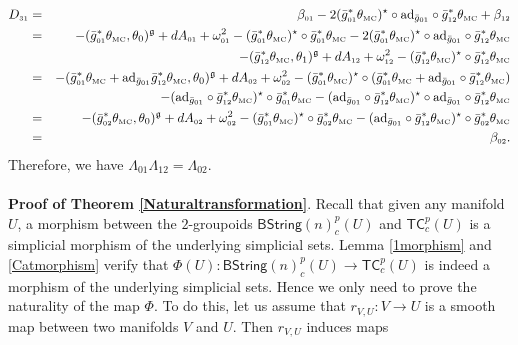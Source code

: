 \documentclass[letterpaper,10pt, oneside]{article} %
\newcommand{\tcalgdp}{{\mathsf{TC}^{p}_{c}}} %
\newcommand{\bstringnp}{\mathsf{BString}(n)^p_{c}} %
\newcommand{\TM}{\theta_{\scriptscriptstyle \mathrm{MC}}}
\def\qed{\hfill ~\vrule height6pt width6pt depth0pt}
\newcommand{\ad}{\mathrm{ad}}
\newcommand{\bg}{\bar{g}}
\begin{document}
\begin{eqnarray*}
  D_{\scriptscriptstyle 31}&=& \beta_{\scriptscriptstyle 01}-2(\bg_{\scriptscriptstyle 01}^*\TM)^\star\circ \ad_{\bg_{\scriptscriptstyle 01}}\circ\bg_{\scriptscriptstyle 12}^*\TM+\beta_{\scriptscriptstyle 12}\\
  &=&-(\bar{g}_{\scriptscriptstyle 01}^*\TM,\theta_0)^\g+dA_{\scriptscriptstyle 01}+\omega^2_{\scriptscriptstyle 01}-(\bar{g}_{\scriptscriptstyle 01}^*\TM)^\star \circ \bar{g}_{\scriptscriptstyle 01}^*\TM
  -2(\bg_{\scriptscriptstyle 01}^*\TM)^\star\circ \ad_{\bg_{\scriptscriptstyle 01}}\circ\bg_{\scriptscriptstyle 12}^*\TM\\
  &&
  -(\bar{g}_{\scriptscriptstyle 12}^*\TM,\theta_1)^\g+dA_{\scriptscriptstyle 12}+\omega^2_{\scriptscriptstyle 12}-(\bar{g}_{\scriptscriptstyle 12}^*\TM)^\star \circ \bar{g}_{\scriptscriptstyle 12}^*\TM\\
  &=&-(\bg_{\scriptscriptstyle 01}^*\TM+\ad_{\bg_{\scriptscriptstyle 01}}\bg_{\scriptscriptstyle 12}^*\TM,\theta_0)^\g+dA_{\scriptscriptstyle 02}+\omega^2_{\scriptscriptstyle 02}-(\bar{g}_{\scriptscriptstyle 01}^*\TM)^\star \circ (\bar{g}_{\scriptscriptstyle 01}^*\TM
  + \ad_{\bg_{\scriptscriptstyle 01}}\circ\bg_{\scriptscriptstyle 12}^*\TM)\\
  &&-(\ad_{\bg_{\scriptscriptstyle 01}}\circ\bg_{\scriptscriptstyle 12}^*\TM)^\star\circ \bg_{\scriptscriptstyle 01}^*\TM-(\ad_{\bg_{\scriptscriptstyle 01}}\circ\bar{g}_{\scriptscriptstyle 12}^*\TM)^\star \circ\ad_{\bg_{\scriptscriptstyle 01}}\circ \bar{g}_{\scriptscriptstyle 12}^*\TM\\
  &=&-(\bg_{\scriptscriptstyle 02}^*\TM,\theta_0)^\g+dA_{\scriptscriptstyle 02}+\omega^2_{\scriptscriptstyle 02}-(\bar{g}_{\scriptscriptstyle 01}^*\TM)^\star \circ \bar{g}_{\scriptscriptstyle 02}^*\TM-(\ad_{\bg_{\scriptscriptstyle 01}}\circ\bg_{\scriptscriptstyle 12}^*\TM)^\star\circ \bg_{\scriptscriptstyle 02}^*\TM\\
  &=&\beta_{\scriptscriptstyle 02}.
\end{eqnarray*}
Therefore, we have $\Lambda_{01}\Lambda_{12}=\Lambda_{02}$.\qed
\\
\\
{\bf Proof of Theorem \ref{Naturaltransformation}}. Recall that given any manifold $U$, a morphism between the $2$-groupoids $\bstringnp(U)$ and $\tcalgdp(U)$ is a simplicial morphism of the underlying simplicial sets.
Lemma
\ref{1morphism} and \ref{Catmorphism} verify that
$\Phi(U):\bstringnp(U)\rightarrow\tcalgdp(U)$ is indeed a morphism of the underlying simplicial sets. Hence we only need to prove the naturality of the map $\Phi$. To do this, let us assume that $r_{V,U}:V\rightarrow U$ is a smooth map between two manifolds $V$ and $U$. Then $r_{V,U}$ induces maps
\end{document}
